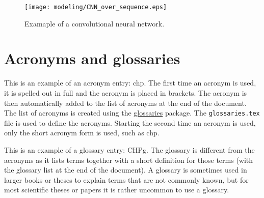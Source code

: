 \begin{figure}[htb]
	\centering
    \texttt{[image: modeling/CNN\_over\_sequence.eps]}
    \caption{Examaple of a convolutional neural network.}
	\label{fig:cnn}
\end{figure}

\section{Acronyms and glossaries}
\label{sec:acronyms}
This is an example of an acronym entry: \gls{chp}. The first time an acronym is used, it is spelled out in full and the acronym is placed in brackets. The acronym is then automatically added to the list of acronyms at the end of the document. The list of acronyms is created using the \href{https://ctan.org/pkg/glossaries}{glossaries} package. The \texttt{glossaries.tex} file is used to define the acronyms. Starting the second time an acronym is used, only the short acronym form is used, such as \gls{chp}.

This is an example of a glossary entry: \gls{CHPg}. The glossary is different from the acronyms as it lists terms together with a short definition for those terms (with the glossary list at the end of the document). A glossary is sometimes used in larger books or theses to explain terms that are not commonly known, but for most scientific theses or papers it is rather uncommon to use a glossary. 

